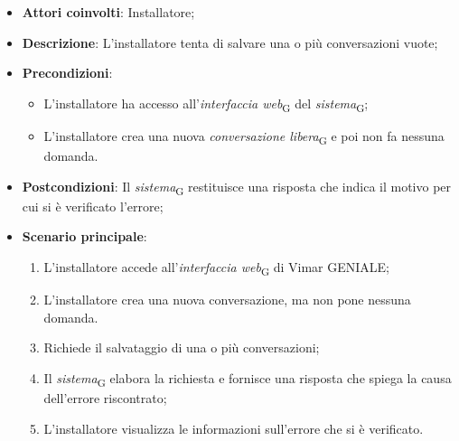 \begin{itemize}
    \item \textbf{Attori coinvolti}: Installatore;
    \item \textbf{Descrizione}: L’installatore tenta di salvare una o più conversazioni vuote;
    \item \textbf{Precondizioni}: 
        \begin{itemize}
            \item L’installatore ha accesso all’\textit{interfaccia web}\textsubscript{G} del \textit{sistema}\textsubscript{G};
            \item L'installatore crea una nuova \textit{conversazione libera}\textsubscript{G} e poi non fa nessuna domanda.
        \end{itemize}
    \item \textbf{Postcondizioni}: Il \textit{sistema}\textsubscript{G} restituisce una risposta che indica il motivo per cui si è verificato l’errore;
    \item \textbf{Scenario principale}:
    \begin{enumerate}
    \item L’installatore accede all’\textit{interfaccia web}\textsubscript{G} di Vimar GENIALE;
    \item L'installatore crea una nuova conversazione, ma non pone nessuna domanda.
    \item Richiede il salvataggio di una o più conversazioni;
    \item Il \textit{sistema}\textsubscript{G} elabora la richiesta e fornisce una risposta che spiega la causa dell'errore riscontrato;
    \item L’installatore visualizza le informazioni sull’errore che si è verificato.
    \end{enumerate}
\end{itemize}



